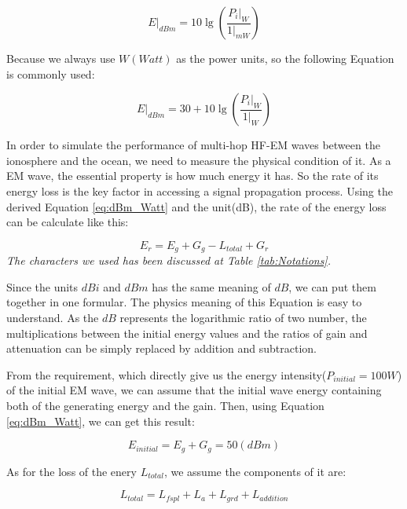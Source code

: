 \documentclass{mcmthesis}
\begin{document}
      \begin{equation}\label{eq:dBm_milliWatt}
        E |_{dBm} = 10 \lg(\frac{P_{i}|_{W}}{1 |_{mW} })
      \end{equation}

    Because we always use $W(Watt)$ as the power units, so the following Equation is commonly used:

      \begin{equation}\label{eq:dBm_Watt}
        E |_{dBm} = 30 + 10 \lg(\frac{P_{i}|_{W}}{1 |_{W} })
      \end{equation}

    In order to simulate the performance of multi-hop HF-EM waves between the ionosphere and the ocean, we need to measure the physical condition of it. As a EM wave, the essential property is how much energy it has. So the rate of its energy loss is the key factor in accessing a signal propagation process. Using the derived Equation \ref{eq:dBm_Watt} and the unit(dB), the rate of the energy loss can be calculate like this:

      \begin{equation}\label{eq:transmitting}
        E_{r} = E_{g} + G_{g} - L_{total} + G_{r}
      \end{equation}
      \emph{The characters we used has been discussed at Table \ref{tab:Notations}.}

    Since the units \emph{$dBi$} and \emph{$dBm$} has the same meaning of \emph{$dB$}, we can put them together in one formular. The physics meaning of this Equation is easy to understand. As the \emph{$dB$} represents the logarithmic ratio of two number, the multiplications between the initial energy values and the ratios of gain and attenuation can be simply replaced by addition and subtraction.

    From the requirement, which directly give us the energy intensity($P_{initial} = 100 W $) of the initial EM wave, we can assume that the initial wave energy containing both of the generating energy and the gain. Then, using Equation \ref{eq:dBm_Watt}, we can get this result:

      \begin{equation}\label{eq:E_initial}
        E_{initial} = E_{g} + G_{g} = 50 (dBm)
      \end{equation}

    As for the loss of the enery $L_{total}$, we assume the components of it are:

      \begin{equation}\label{eq:L_total}
        L_{total} = L_{fspl} + L_{a} + L_{grd} + L_{addition}
      \end{equation}
\end{document}
